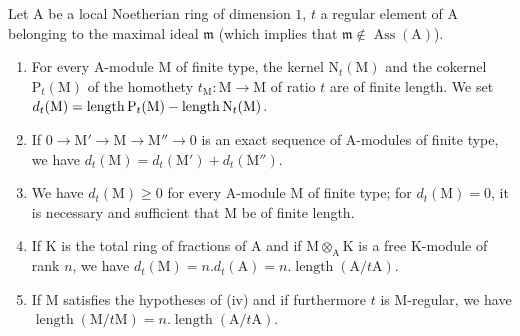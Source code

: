 \begin{lemma}[21.10.13]
\label{IV.21.10.13}
Let $\mathrm{A}$ be a local Noetherian ring of dimension $1$, $t$ a regular element of $\mathrm{A}$ belonging to the maximal ideal $\mathfrak{m}$ (which implies that $\mathfrak{m}\notin\operatorname{Ass}(\mathrm{A})$).
\begin{enumerate}[label=\textup{(\roman*)}]
  \item For every A-module $\mathrm{M}$ of finite type, the kernel $\mathrm{N}_t(\mathrm{M})$ and the cokernel $\mathrm{P}_t(\mathrm{M})$ of the homothety $t_{\mathrm{M}}:\mathrm{M}\to\mathrm{M}$ of ratio $t$ are of finite length. We set $d_t(\mathrm{M})=\operatorname{length}\mathrm{P}_t(\mathrm{M})-\operatorname{length}\mathrm{N}_t(\mathrm{M})$.
  \item If $0\to\mathrm{M}'\to\mathrm{M}\to\mathrm{M}''\to 0$ is an exact sequence of A-modules of finite type, we have $d_t(\mathrm{M})=d_t(\mathrm{M}')+d_t(\mathrm{M}'')$.
  \item We have $d_t(\mathrm{M})\geq 0$ for every A-module $\mathrm{M}$ of finite type; for $d_t(\mathrm{M})=0$, it is necessary and sufficient that $\mathrm{M}$ be of finite length.
  \item If $\mathrm{K}$ is the total ring of fractions of $\mathrm{A}$ and if $\mathrm{M}\otimes_{\mathrm{A}}\mathrm{K}$ is a free $\mathrm{K}$-module of rank $n$, we have $d_t(\mathrm{M})=n. d_t(\mathrm{A})=n.\operatorname{length}(\mathrm{A}/t\mathrm{A})$.
  \item If $\mathrm{M}$ satisfies the hypotheses of \textup{(iv)} and if furthermore $t$ is $\mathrm{M}$-regular, we have $\operatorname{length}(\mathrm{M}/t\mathrm{M})=n.\operatorname{length}(\mathrm{A}/t\mathrm{A})$.
\end{enumerate}
\end{lemma}

